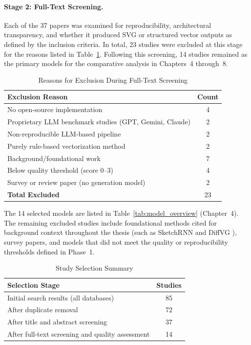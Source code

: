 \paragraph{Stage 2: Full-Text Screening.}
Each of the 37 papers was examined for reproducibility, architectural transparency, and whether it produced SVG or structured vector outputs as defined by the inclusion criteria. In total, 23 studies were excluded at this stage for the reasons listed in Table~\ref{tab:exclusion-reasons}. Following this screening, 14 studies remained as the primary models for the comparative analysis in Chapters~4 through~8.

\begin{table}[H]
\centering
\caption{Reasons for Exclusion During Full-Text Screening}
\label{tab:exclusion-reasons}
\begin{tabular}{l c}
\hline
\textbf{Exclusion Reason} & \textbf{Count} \\
\hline
No open-source implementation                          & 4 \\
Proprietary LLM benchmark studies (GPT, Gemini, Claude) & 2 \\
Non-reproducible LLM-based pipeline                    & 2 \\
Purely rule-based vectorization method                 & 2 \\
Background/foundational work                           & 7 \\
Below quality threshold (score 0--3)                   & 4 \\
Survey or review paper (no generation model)           & 2 \\
\hline
\textbf{Total Excluded} & 23 \\
\hline
\end{tabular}
\end{table}

The 14 selected models are listed in Table~\ref{tab:model_overview} (Chapter~4). The remaining excluded studies include foundational methods cited for background context throughout the thesis (such as SketchRNN \cite{haNeuralRepresentationSketch2017} and DiffVG \cite{liDifferentiableVectorGraphics2020a}), survey papers, and models that did not meet the quality or reproducibility thresholds defined in Phase~1.

\begin{table}[H]
\centering
\caption{Study Selection Summary}
\label{tab:selection-summary}
\begin{tabular}{l c}
\hline
\textbf{Selection Stage} & \textbf{Studies} \\
\hline
Initial search results (all databases)  & 85 \\
After duplicate removal                 & 72 \\
After title and abstract screening      & 37 \\
After full-text screening and quality assessment & 14 \\
\hline
\end{tabular}
\end{table}
